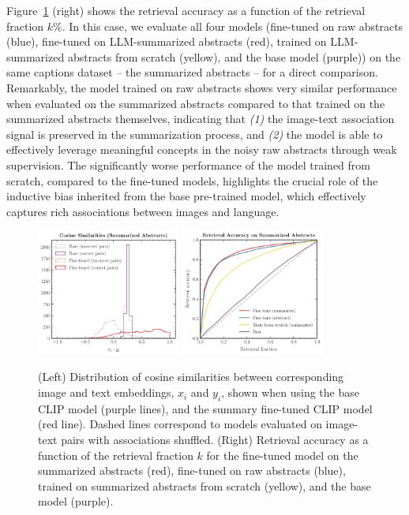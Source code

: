 \documentclass{article} %
\begin{document}
   Figure~\ref{fig:sim_valtrain} (right) shows the retrieval accuracy as a function of the retrieval fraction $k\%$.
   In this case, we evaluate all four models (fine-tuned on raw abstracts (blue), fine-tuned on LLM-summarized abstracts (red), trained on LLM-summarized abstracts from scratch (yellow), and the base model (purple)) on the same captions dataset -- the summarized abstracts -- for a direct comparison.
   Remarkably, the model trained on raw abstracts shows very similar performance when evaluated on the summarized abstracts compared to that trained on the summarized abstracts themselves, indicating that \emph{(1)} the image-text association signal is preserved in the summarization process, and \emph{(2)} the model is able to effectively leverage meaningful concepts in the noisy raw abstracts through weak supervision. The significantly worse performance of the model trained from scratch, compared to the fine-tuned models, highlights the crucial role of the inductive bias inherited from the base pre-trained model, which effectively captures rich associations between images and language.
   
   \begin{figure}[!h]
    \centering
     \includegraphics[width=0.42\textwidth]{plots/sim_val.pdf}
     \includegraphics[width=0.42\textwidth]{plots/retrieval.pdf}
     \caption{(Left) Distribution of cosine similarities between corresponding image and text embeddings, $x_i$ and $y_i$, shown when using the base CLIP model (purple lines), and the summary fine-tuned CLIP model (red line). Dashed lines correspond to models evaluated on image-text pairs with associations shuffled. (Right) Retrieval accuracy as a function of the retrieval fraction $k$ for the fine-tuned model on the summarized abstracts (red), fine-tuned on raw abstracts (blue), trained on summarized abstracts from scratch (yellow), and the base model (purple).}
     \label{fig:sim_valtrain}
     \end{figure}
   
\end{document}
